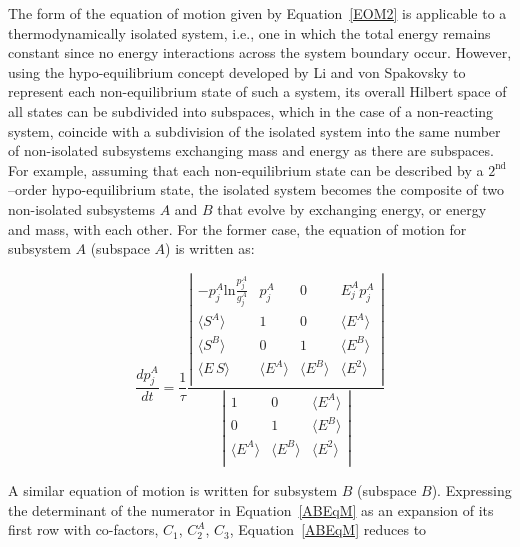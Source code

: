 \documentclass[
journal=jcisd8, %
manuscript=article,
layout=twocolumn   %
]{achemso}
\begin{document}
The form of the equation of motion given by Equation~\ref{EOM2} is applicable to a thermodynamically isolated system, i.e., one in which the total energy remains constant since no energy interactions across the system boundary occur. However, using the hypo-equilibrium concept developed by Li and von Spakovsky \cite{Li2016a} to represent each non-equilibrium state of such a system, its overall Hilbert space of all states can be subdivided into subspaces, which in the case of a non-reacting system, coincide with a subdivision of the isolated system into the same number of non-isolated subsystems  exchanging mass and energy as there are subspaces. For example, assuming that each non-equilibrium state can be described by a $2^\text{nd}$--order hypo-equilibrium state, the isolated system becomes the composite of two non-isolated subsystems $A$ and $B$ that evolve by exchanging energy, or energy and mass, with each other. For the former case, the equation of motion for subsystem $A$ (subspace $A$) is written as:

\begin{equation}
\frac{dp_j^A}{dt}=\frac {1} {\tau}\frac{\left|
\begin{array}{cccc}
 -p_j^A \text{ln}\frac{p_j^A}{g_j^A} & p_j^A &0 & {E}_j^A p_j^A \\
 \langle S^A \rangle & 1 & 0 &\langle E^A \rangle \\
 \langle S^B \rangle & 0 & 1 &\langle E^B \rangle \\
 \langle E\,S \rangle & \langle E^A \rangle & \langle E^B \rangle & \langle E^2 \rangle \\
\end{array}
\right|}{\left|
\begin{array}{ccc}
 1 & 0&
\langle E^A \rangle \\
  0&1&\langle E^B \rangle \\
   \langle E^A \rangle &\langle E^B \rangle &\langle E^2 \rangle\\
\end{array}
\right|}
\label{ABEqM}
\end{equation}

A similar equation of motion is written for subsystem $B$ (subspace $B$). Expressing the determinant of the numerator in Equation~\ref{ABEqM} as an expansion of its first row with co-factors, $C_1$, $C^{A}_{2}$, $C_3$, Equation~\ref{ABEqM} reduces to
\end{document}
